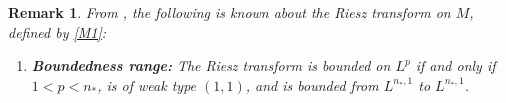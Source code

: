 \documentclass[12pt]{amsart}
\newtheorem{remark}[theorem]{Remark}
\begin{document}
\begin{remark}\label{klopot}
From \cite{HS,He1}, the following is known about the Riesz transform on \( M \), defined by \eqref{M1}:




\begin{enumerate}[label=\arabic*)]
    \item \textbf{Boundedness range:} The Riesz transform is bounded on \( L^p \) if and only if \( 1 < p < n_* \), is of weak type \( (1,1) \), and is bounded from \( L^{n_*,1} \) to \( L^{n_*,1} \).


\end{enumerate}
\end{remark}
\end{document}

